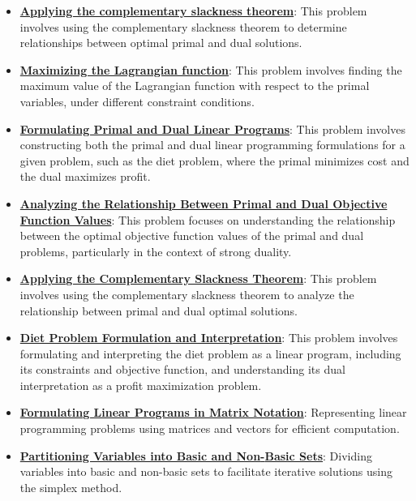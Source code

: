 \documentclass{article}%
\begin{document}
\begin{itemize}[leftmargin=*]
\item \href{https://www.math.purdue.edu/~yipn/421/2024-09-17-DualityGeneral.pdf#page=22}{\textbf{Applying the complementary slackness theorem}}: This problem involves using the complementary slackness theorem to determine relationships between optimal primal and dual solutions. %
\item \href{https://www.math.purdue.edu/~yipn/421/2024-09-17-DualityGeneral.pdf#page=3}{\textbf{Maximizing the Lagrangian function}}: This problem involves finding the maximum value of the Lagrangian function with respect to the primal variables, under different constraint conditions. %
\item \href{https://www.math.purdue.edu/~yipn/421/2024-09-19-DualityExamples.pdf#page=1}{\textbf{Formulating Primal and Dual Linear Programs}}: This problem involves constructing both the primal and dual linear programming formulations for a given problem, such as the diet problem, where the primal minimizes cost and the dual maximizes profit. %
\item \href{https://www.math.purdue.edu/~yipn/421/2024-09-19-DualityExamples.pdf#page=1}{\textbf{Analyzing the Relationship Between Primal and Dual Objective Function Values}}: This problem focuses on understanding the relationship between the optimal objective function values of the primal and dual problems, particularly in the context of strong duality. %
\item \href{https://www.math.purdue.edu/~yipn/421/2024-09-19-DualityExamples.pdf#page=1}{\textbf{Applying the Complementary Slackness Theorem}}: This problem involves using the complementary slackness theorem to analyze the relationship between primal and dual optimal solutions. %
\item \href{https://www.math.purdue.edu/~yipn/421/2024-09-19-DualityExamples.pdf#page=2}{\textbf{Diet Problem Formulation and Interpretation}}: This problem involves formulating and interpreting the diet problem as a linear program, including its constraints and objective function, and understanding its dual interpretation as a profit maximization problem. %
\item \href{https://www.math.purdue.edu/~yipn/421/2024-09-24-SimplexMatrix.pdf#page=1}{\textbf{Formulating Linear Programs in Matrix Notation}}: Representing linear programming problems using matrices and vectors for efficient computation. %
\item \href{https://www.math.purdue.edu/~yipn/421/2024-09-24-SimplexMatrix.pdf#page=4}{\textbf{Partitioning Variables into Basic and Non{-}Basic Sets}}: Dividing variables into basic and non-basic sets to facilitate iterative solutions using the simplex method. %

\end{itemize}
\end{document}

